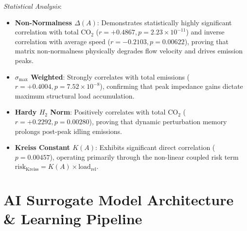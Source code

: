 \documentclass[lettersize,journal]{IEEEtran}
\begin{document}
\textit{Statistical Analysis}:
\begin{itemize}
    \item \textbf{Non-Normalness $\Delta(A)$}: Demonstrates statistically highly significant correlation with total $\text{CO}_2$ ($r = +0.4867, p = 2.23 \times 10^{-11}$) and inverse correlation with average speed ($r = -0.2103, p = 0.00622$), proving that matrix non-normalness physically degrades flow velocity and drives emission peaks.
    \item \textbf{$\sigma_{\max}$ Weighted}: Strongly correlates with total emissions ($r = +0.4004, p = 7.52 \times 10^{-8}$), confirming that peak impedance gains dictate maximum structural load accumulation.
    \item \textbf{Hardy $H_2$ Norm}: Positively correlates with total $\text{CO}_2$ ($r = +0.2292, p = 0.00280$), proving that dynamic perturbation memory prolongs post-peak idling emissions.
    \item \textbf{Kreiss Constant $K(A)$}: Exhibits significant direct correlation ($p = 0.00457$), operating primarily through the non-linear coupled risk term $\text{risk}_{\text{Kreiss}} = K(A) \times \text{load}_{\text{rel}}$.
\end{itemize}

\section{AI Surrogate Model Architecture \& Learning Pipeline}
\end{document}
